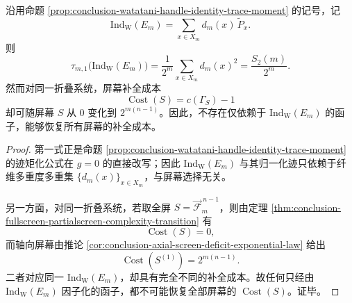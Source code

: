 \begin{theorem}\label{thm:conclusion-watatani-screen-completion-functor-independence}
沿用命题 \ref{prop:conclusion-watatani-handle-identity-trace-moment} 的记号，记
\[
\mathrm{Ind}_{\mathrm W}(E_m)=\sum_{x\in X_m}d_m(x)\,\widetilde P_x.
\]
则
\[
\tau_{m,1}\!\bigl(\mathrm{Ind}_{\mathrm W}(E_m)\bigr)
=
\frac{1}{2^m}\sum_{x\in X_m}d_m(x)^2
=
\frac{S_2(m)}{2^m}.
\]
然而对同一折叠系统，屏幕补全成本
\[
\operatorname{Cost}(S)=c(\Gamma_S)-1
\]
却可随屏幕 \(S\) 从 \(0\) 变化到 \(2^{m(n-1)}\)。因此，不存在仅依赖于 \(\mathrm{Ind}_{\mathrm W}(E_m)\) 的函子，能够恢复所有屏幕的补全成本。
\end{theorem}
\begin{proof}
第一式正是命题 \ref{prop:conclusion-watatani-handle-identity-trace-moment} 的迹矩化公式在 \(g=0\) 的直接改写；因此 \(\mathrm{Ind}_{\mathrm W}(E_m)\) 与其归一化迹只依赖于纤维多重度多重集 \(\{d_m(x)\}_{x\in X_m}\)，与屏幕选择无关。

另一方面，对同一折叠系统，若取全屏 \(S=\overrightarrow{\mathcal F}^{\,n-1}_m\)，则由定理 \ref{thm:conclusion-fullscreen-partialscreen-complexity-transition} 有
\[
\operatorname{Cost}(S)=0,
\]
而轴向屏幕由推论 \ref{cor:conclusion-axial-screen-deficit-exponential-law} 给出
\[
\operatorname{Cost}(S^{(1)})=2^{m(n-1)}.
\]
二者对应同一 \(\mathrm{Ind}_{\mathrm W}(E_m)\)，却具有完全不同的补全成本。故任何只经由 \(\mathrm{Ind}_{\mathrm W}(E_m)\) 因子化的函子，都不可能恢复全部屏幕的 \(\operatorname{Cost}(S)\)。证毕。
\end{proof}
